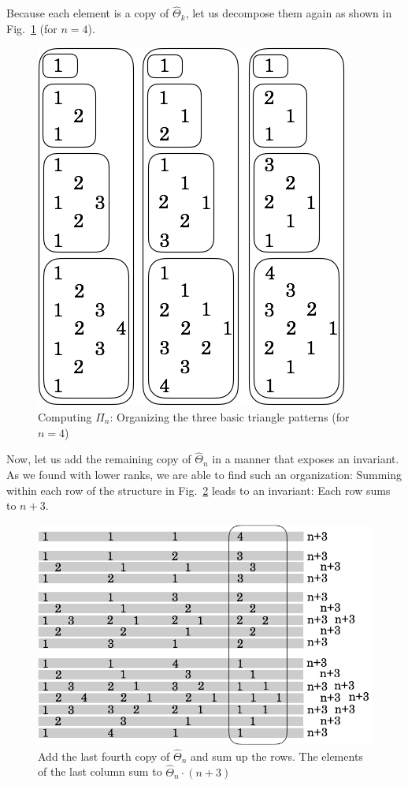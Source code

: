 Because each element is a  copy of $\widehat{\Theta}_k$, let us decompose them again as shown in Fig.~\ref{fig:Tetrahedral7} (for $n=4$).  %
\begin{figure}[h]
\begin{center}
        \includegraphics[scale=0.35]{FiguresArithmetic/appTetrahedral7}
        \caption{Computing $\Pi_n$: Organizing the three basic triangle patterns (for $n=4$)}
        \label{fig:Tetrahedral7}
\end{center}
\end{figure}
Now, let us add the remaining copy of $\widehat{\Theta}_n$ in a manner that exposes an invariant.  As we found with lower ranks, we are able to find such an organization:  Summing within each row of the structure in Fig.~\ref{fig:Tetrahedral5} leads to an invariant: Each row sums to $n+3$.
\begin{figure}[h]
\begin{center}
        \includegraphics[scale=0.35]{FiguresArithmetic/appTetrahedral5}
        \caption{Add the last fourth copy of $\widehat{\Theta}_n$ and sum up the rows. The elements of the last column sum to $\widehat{\Theta}_n \cdot (n+3)$}
        \label{fig:Tetrahedral5}
\end{center}
\end{figure}
